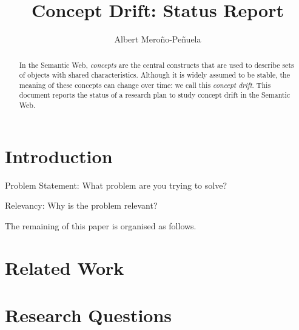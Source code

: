 \documentclass{llncs}
\begin{document}
\mainmatter %

\title{Concept Drift: Status Report}


\author{Albert Mero\~{n}o-Pe\~{n}uela}

%
%


\maketitle

\begin{abstract}
In the Semantic Web, \emph{concepts} are the central constructs that
are used to describe sets of objects with shared
characteristics. Although it is widely assumed to be stable, the
meaning of these concepts can change over time: we call this
\emph{concept drift}. This document reports the status of a research
plan to study concept drift in the Semantic Web.
\end{abstract}

\section{Introduction}
\label{sec:intro}

Problem Statement: What problem are you trying to solve?

Relevancy: Why is the problem relevant?

The remaining of this paper is organised as follows.

\section{Related Work}
\label{sec:related-work}

\section{Research Questions}
\end{document}
